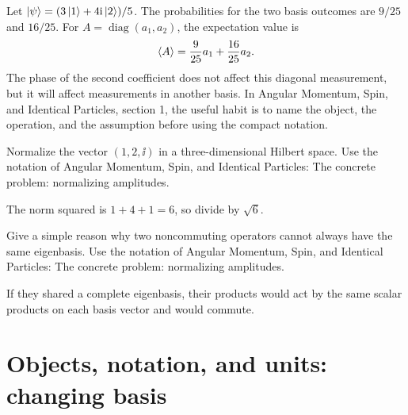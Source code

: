 \begin{example}
Let \(\left|\psi\right\rangle=(3\left|1\right\rangle+4\mathrm i\left|2\right\rangle)/5\).  The probabilities for the two basis outcomes are \(9/25\) and \(16/25\).  For \(A=\operatorname{diag}(a_1,a_2)\), the expectation value is
\[
  \left\langle A\right\rangle=\frac{9}{25}a_1+\frac{16}{25}a_2.
\]
The phase of the second coefficient does not affect this diagonal measurement, but it will affect measurements in another basis.  In Angular Momentum, Spin, and Identical Particles, section 1, the useful habit is to name the object, the operation, and the assumption before using the compact notation.
\end{example}



\begin{exercise}
Normalize the vector \((1,2,\ii)\) in a three-dimensional Hilbert space.  Use the notation of Angular Momentum, Spin, and Identical Particles: The concrete problem: normalizing amplitudes.
\begin{answer}
The norm squared is \(1+4+1=6\), so divide by \(\sqrt6\).
\end{answer}
\end{exercise}

\begin{exercise}
Give a simple reason why two noncommuting operators cannot always have the same eigenbasis.  Use the notation of Angular Momentum, Spin, and Identical Particles: The concrete problem: normalizing amplitudes.
\begin{answer}
If they shared a complete eigenbasis, their products would act by the same scalar products on each basis vector and would commute.
\end{answer}
\end{exercise}



\section{Objects, notation, and units: changing basis}













